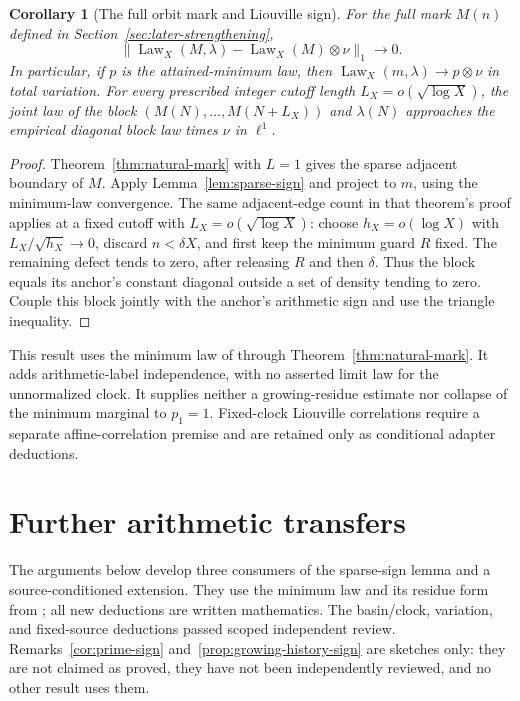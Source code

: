 \documentclass[11pt]{amsart}
\newtheorem{corollary}[theorem]{Corollary}
\theoremstyle{definition}
\theoremstyle{remark}
\begin{document}
\begin{corollary}[The full orbit mark and Liouville sign]\label{cor:marked-sign}
For the full mark $M(n)$ defined in Section~\ref{sec:later-strengthening},
\[
 \|\operatorname{Law}_X(M,\lambda)-\operatorname{Law}_X(M)\otimes\nu\|_1\to0.
\]
In particular, if $p$ is the attained-minimum law, then $\operatorname{Law}_X(m,\lambda)\to p\otimes\nu$ in total variation. For every prescribed integer cutoff length $L_X=o(\sqrt{\log X})$, the joint law of the block $(M(N),\ldots,M(N+L_X))$ and $\lambda(N)$ approaches the empirical diagonal block law times $\nu$ in $\ell^1$.
\end{corollary}
\begin{proof}
Theorem~\ref{thm:natural-mark} with $L=1$ gives the sparse adjacent boundary of $M$. Apply Lemma~\ref{lem:sparse-sign} and project to $m$, using the minimum-law convergence. The same adjacent-edge count in that theorem's proof applies at a fixed cutoff with $L_X=o(\sqrt{\log X})$: choose $h_X=o(\log X)$ with $L_X/\sqrt{h_X}\to0$, discard $n<\delta X$, and first keep the minimum guard $R$ fixed. The remaining defect tends to zero, after releasing $R$ and then $\delta$. Thus the block equals its anchor's constant diagonal outside a set of density tending to zero. Couple this block jointly with the anchor's arithmetic sign and use the triangle inequality.
\end{proof}
This result uses the minimum law of \cite{BM} through Theorem~\ref{thm:natural-mark}. It adds arithmetic-label independence, with no asserted limit law for the unnormalized clock. It supplies neither a growing-residue estimate nor collapse of the minimum marginal to $p_1=1$. Fixed-clock Liouville correlations require a separate affine-correlation premise and are retained only as conditional adapter deductions.

\section{Further arithmetic transfers}\label{sec:arithmetic-transfers}
The arguments below develop three consumers of the sparse-sign lemma and a source-conditioned extension. They use the minimum law and its residue form from \cite{BM}; all new deductions are written mathematics. The basin/clock, variation, and fixed-source deductions passed scoped independent review. Remarks~\ref{cor:prime-sign} and~\ref{prop:growing-history-sign} are sketches only: they are not claimed as proved, they have not been independently reviewed, and no other result uses them.
\end{document}
